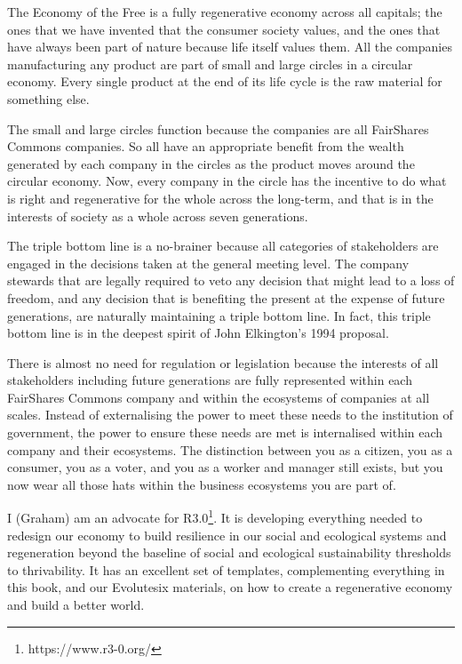 The Economy of the Free is a fully regenerative economy across all capitals; the ones that we have invented that the consumer society values, and the ones that have always been part of nature because life itself values them. All the companies manufacturing any product are part of small and large circles in a circular economy. Every single product at the end of its life cycle is the raw material for something else.


The small and large circles function because the companies are all FairShares Commons companies. So all have an appropriate benefit from the wealth generated by each company in the circles as the product moves around the circular economy. Now, every company in the circle has the incentive to do what is right and regenerative for the whole across the long-term, and that is in the interests of society as a whole across seven generations.


The triple bottom line is a no-brainer because all categories of stakeholders are engaged in the decisions taken at the general meeting level. The company stewards that are legally required to veto any decision that might lead to a loss of freedom, and any decision that is benefiting the present at the expense of future generations, are naturally maintaining a triple bottom line. In fact, this triple bottom line is in the deepest spirit of John Elkington's 1994 proposal\cite{elkington-triple}.


There is almost no need for regulation or legislation because the interests of all stakeholders including future generations are fully represented within each FairShares Commons company and within the ecosystems of companies at all scales. Instead of externalising the power to meet these needs to the institution of government, the power to ensure these needs are met is internalised within each company and their ecosystems. The distinction between you as a citizen, you as a consumer, you as a voter, and you as a worker and manager still exists, but you now wear all those hats within the business ecosystems you are part of.


I (Graham) am an advocate for R3.0\footnote{https://www.r3-0.org/}. It is developing everything needed to redesign our economy to build resilience in our social and ecological systems and regeneration  beyond the baseline of social and ecological sustainability thresholds to thrivability. It has an excellent set of templates, complementing everything in this book, and our Evolutesix materials, on how to create a regenerative economy and build a better world. 


